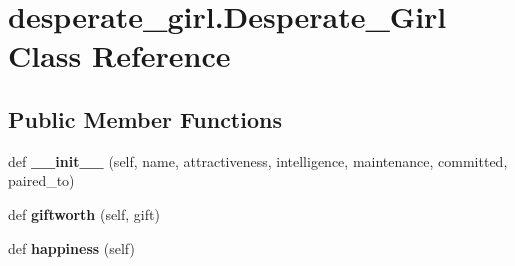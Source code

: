 \hypertarget{classdesperate__girl_1_1_desperate___girl}{}\section{desperate\+\_\+girl.\+Desperate\+\_\+\+Girl Class Reference}
\label{classdesperate__girl_1_1_desperate___girl}
\subsection*{Public Member Functions}
\begin{DoxyCompactItemize}
\item 
\mbox{\label{classdesperate__girl_1_1_desperate___girl_ab79e28f51333e510187e105106ec8dca}} 
def {\bfseries \+\_\+\+\_\+init\+\_\+\+\_\+} (self, name, attractiveness, intelligence, maintenance, committed, paired\+\_\+to)
\item 
\mbox{\label{classdesperate__girl_1_1_desperate___girl_ad840fc289e5dc74f86133a429f3b145d}} 
def {\bfseries giftworth} (self, gift)
\item 
\mbox{\label{classdesperate__girl_1_1_desperate___girl_af80bc07443149f82a9d17d2f86a0c06a}} 
def {\bfseries happiness} (self)
\end{DoxyCompactItemize}
